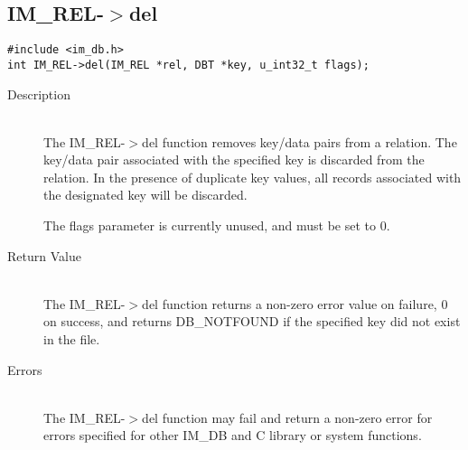 \documentclass[11pt]{article}
\def\cdf{\sf }
\def\cdf{\sf }
\newcommand{\IMDB}{{\small{\cdf IM\_DB}}}
\newcommand{\IMREL}{{\small{\cdf IM\_REL}}}
\newcommand{\DBNOTFOUND}{{\small{\cdf DB\_NOTFOUND}}}
\begin{document}
\newpage
\subsection{{\IMREL}-$>$del}
\begin{verbatim}
#include <im_db.h>
int IM_REL->del(IM_REL *rel, DBT *key, u_int32_t flags);
\end{verbatim}
\begin{description}
\item[Description]\ \\
  The {\IMREL}-$>$del function removes key/data pairs from a
  relation. The key/data pair associated with the specified key is
  discarded from the relation. In the presence of duplicate key
  values, all records associated with the designated key will be
  discarded.

  The flags parameter is currently unused, and must be set to 0.
\item[Return Value]\ \\
  The {\IMREL}-$>$del function returns a non-zero error value on
  failure, 0 on success, and returns {\DBNOTFOUND} if the specified key
  did not exist in the file.
\item[Errors]\ \\
The {\IMREL}-$>$del function may fail and return a non-zero error for
errors specified for other {\IMDB} and C library or system functions.
\end{description}

\newpage
\end{document}

